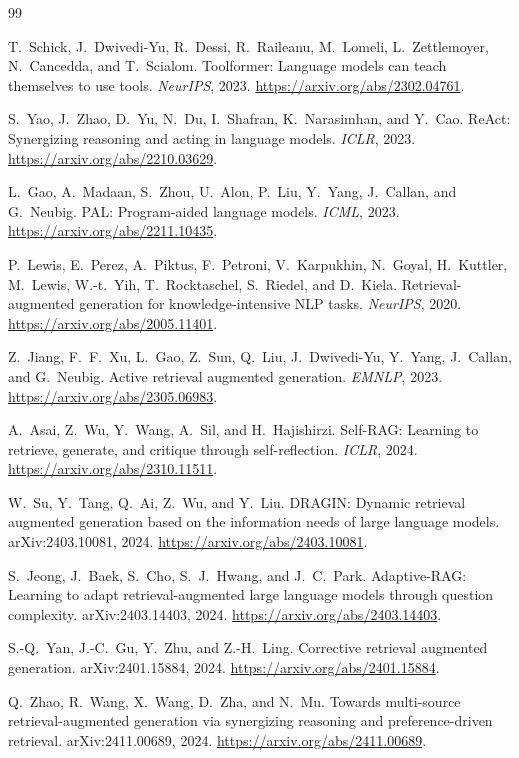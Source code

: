 \documentclass[11pt]{article}
\begin{document}
\begin{thebibliography}{99}

T.~Schick, J.~Dwivedi-Yu, R.~Dessi, R.~Raileanu, M.~Lomeli, L.~Zettlemoyer,
N.~Cancedda, and T.~Scialom.
Toolformer: Language models can teach themselves to use tools.
\emph{NeurIPS}, 2023.
\url{https://arxiv.org/abs/2302.04761}.

S.~Yao, J.~Zhao, D.~Yu, N.~Du, I.~Shafran, K.~Narasimhan, and Y.~Cao.
ReAct: Synergizing reasoning and acting in language models.
\emph{ICLR}, 2023.
\url{https://arxiv.org/abs/2210.03629}.

L.~Gao, A.~Madaan, S.~Zhou, U.~Alon, P.~Liu, Y.~Yang, J.~Callan, and G.~Neubig.
PAL: Program-aided language models.
\emph{ICML}, 2023.
\url{https://arxiv.org/abs/2211.10435}.

P.~Lewis, E.~Perez, A.~Piktus, F.~Petroni, V.~Karpukhin, N.~Goyal,
H.~Kuttler, M.~Lewis, W.-t.~Yih, T.~Rocktaschel, S.~Riedel, and D.~Kiela.
Retrieval-augmented generation for knowledge-intensive NLP tasks.
\emph{NeurIPS}, 2020.
\url{https://arxiv.org/abs/2005.11401}.

Z.~Jiang, F.~F.~Xu, L.~Gao, Z.~Sun, Q.~Liu, J.~Dwivedi-Yu, Y.~Yang,
J.~Callan, and G.~Neubig.
Active retrieval augmented generation.
\emph{EMNLP}, 2023.
\url{https://arxiv.org/abs/2305.06983}.

A.~Asai, Z.~Wu, Y.~Wang, A.~Sil, and H.~Hajishirzi.
Self-RAG: Learning to retrieve, generate, and critique through self-reflection.
\emph{ICLR}, 2024.
\url{https://arxiv.org/abs/2310.11511}.

W.~Su, Y.~Tang, Q.~Ai, Z.~Wu, and Y.~Liu.
DRAGIN: Dynamic retrieval augmented generation based on the information needs of
large language models.
arXiv:2403.10081, 2024.
\url{https://arxiv.org/abs/2403.10081}.

S.~Jeong, J.~Baek, S.~Cho, S.~J.~Hwang, and J.~C.~Park.
Adaptive-RAG: Learning to adapt retrieval-augmented large language models
through question complexity.
arXiv:2403.14403, 2024.
\url{https://arxiv.org/abs/2403.14403}.

S.-Q.~Yan, J.-C.~Gu, Y.~Zhu, and Z.-H.~Ling.
Corrective retrieval augmented generation.
arXiv:2401.15884, 2024.
\url{https://arxiv.org/abs/2401.15884}.

Q.~Zhao, R.~Wang, X.~Wang, D.~Zha, and N.~Mu.
Towards multi-source retrieval-augmented generation via synergizing reasoning
and preference-driven retrieval.
arXiv:2411.00689, 2024.
\url{https://arxiv.org/abs/2411.00689}.


\end{thebibliography}
\end{document}
